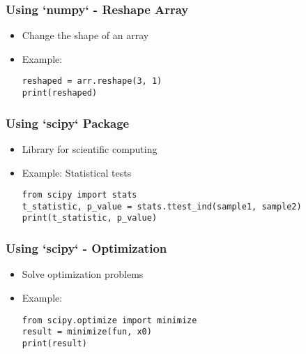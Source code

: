\documentclass{beamer}
\begin{document}
\begin{frame}
    \frametitle{Using `numpy` - Reshape Array}
    \begin{itemize}
        \item Change the shape of an array
        \item Example:
        \begin{tcolorbox}[colback=lightblue, colframe=darkblue, title=Reshape Array]
            \lstinline|reshaped = arr.reshape(3, 1)| \\
            \lstinline|print(reshaped)|
        \end{tcolorbox}
    \end{itemize}
\end{frame}

\begin{frame}
    \frametitle{Using `scipy` Package}
    \begin{itemize}
        \item Library for scientific computing
        \item Example: Statistical tests
        \begin{tcolorbox}[colback=lightblue, colframe=darkblue, title=Statistical Tests]
            \lstinline|from scipy import stats| \\
            \lstinline|t_statistic, p_value = stats.ttest_ind(sample1, sample2)| \\
            \lstinline|print(t_statistic, p_value)|
        \end{tcolorbox}
    \end{itemize}
\end{frame}

\begin{frame}
    \frametitle{Using `scipy` - Optimization}
    \begin{itemize}
        \item Solve optimization problems
        \item Example:
        \begin{tcolorbox}[colback=lightblue, colframe=darkblue, title=Optimization Example]
            \lstinline|from scipy.optimize import minimize| \\
            \lstinline|result = minimize(fun, x0)| \\
            \lstinline|print(result)| 
        \end{tcolorbox}
    \end{itemize}
\end{frame}
\end{document}
